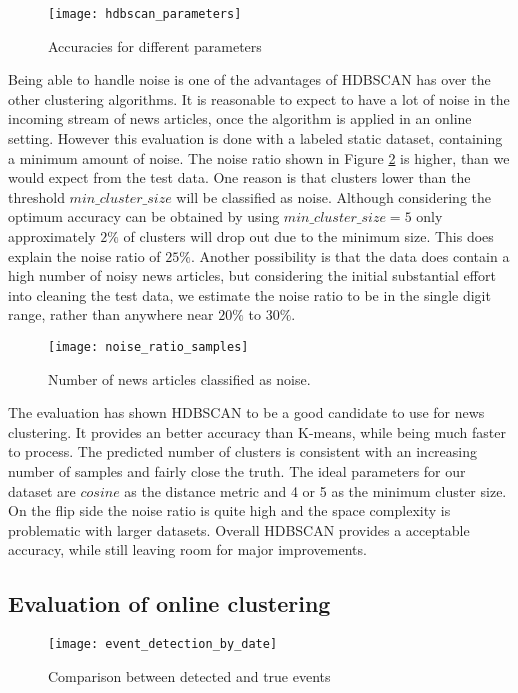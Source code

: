 \begin{figure}[h]
    \centering
    \texttt{[image: hdbscan\_parameters]}
    \caption{Accuracies for different parameters}
    \label{fig:hdbscan_parameters}
\end{figure}


Being able to handle noise is one of the advantages of HDBSCAN has over the other clustering algorithms. It is reasonable to expect to have a lot of noise in the incoming stream of news articles, once the algorithm is applied in an online setting. However this evaluation is done with a labeled static dataset, containing a minimum amount of noise. The noise ratio shown in Figure \ref{fig:noise_ratio_samples} is higher, than we would expect from the test data. One reason is that clusters lower than the threshold $min\_cluster\_size$ will be classified as noise. Although considering the optimum accuracy can be obtained by using $min\_cluster\_size=5$ only approximately $2\%$ of clusters will drop out due to the minimum size. This does explain the noise ratio of $25\%$. Another possibility is that the data does contain a high number of noisy news articles, but considering the initial substantial effort into cleaning the test data, we estimate the noise ratio to be in the single digit range, rather than anywhere near $20\%$ to $30\%$. 


\begin{figure}[h]
    \centering
    \texttt{[image: noise\_ratio\_samples]}
    \caption{Number of news articles classified as noise.}
    \label{fig:noise_ratio_samples}
\end{figure}


The evaluation has shown HDBSCAN to be a good candidate to use for news clustering. It provides an better accuracy than K-means, while being much faster to process. The predicted number of clusters is consistent with an increasing number of samples and fairly close the truth. The ideal parameters for our dataset are $cosine$ as the distance metric and 4 or 5 as the minimum cluster size. On the flip side the noise ratio is quite high and the space complexity is problematic with larger datasets. Overall HDBSCAN provides a acceptable accuracy, while still leaving room for major improvements.

\subsection{Evaluation of online clustering}

\begin{figure}[h]
    \centering
    \texttt{[image: event\_detection\_by\_date]}
    \caption{Comparison between detected and true events}
    \label{fig:event_detection_by_date}
\end{figure}

